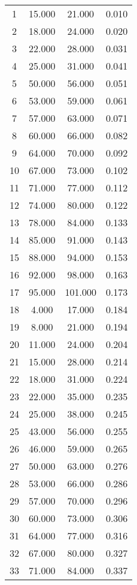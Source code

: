 % 
\begin{tabular}{cccc}
  \hline
  \hline
1 & 15.000 & 21.000 & 0.010 \\ 
  2 & 18.000 & 24.000 & 0.020 \\ 
  3 & 22.000 & 28.000 & 0.031 \\ 
  4 & 25.000 & 31.000 & 0.041 \\ 
  5 & 50.000 & 56.000 & 0.051 \\ 
  6 & 53.000 & 59.000 & 0.061 \\ 
  7 & 57.000 & 63.000 & 0.071 \\ 
  8 & 60.000 & 66.000 & 0.082 \\ 
  9 & 64.000 & 70.000 & 0.092 \\ 
  10 & 67.000 & 73.000 & 0.102 \\ 
  11 & 71.000 & 77.000 & 0.112 \\ 
  12 & 74.000 & 80.000 & 0.122 \\ 
  13 & 78.000 & 84.000 & 0.133 \\ 
  14 & 85.000 & 91.000 & 0.143 \\ 
  15 & 88.000 & 94.000 & 0.153 \\ 
  16 & 92.000 & 98.000 & 0.163 \\ 
  17 & 95.000 & 101.000 & 0.173 \\ 
  18 & 4.000 & 17.000 & 0.184 \\ 
  19 & 8.000 & 21.000 & 0.194 \\ 
  20 & 11.000 & 24.000 & 0.204 \\ 
  21 & 15.000 & 28.000 & 0.214 \\ 
  22 & 18.000 & 31.000 & 0.224 \\ 
  23 & 22.000 & 35.000 & 0.235 \\ 
  24 & 25.000 & 38.000 & 0.245 \\ 
  25 & 43.000 & 56.000 & 0.255 \\ 
  26 & 46.000 & 59.000 & 0.265 \\ 
  27 & 50.000 & 63.000 & 0.276 \\ 
  28 & 53.000 & 66.000 & 0.286 \\ 
  29 & 57.000 & 70.000 & 0.296 \\ 
  30 & 60.000 & 73.000 & 0.306 \\ 
  31 & 64.000 & 77.000 & 0.316 \\ 
  32 & 67.000 & 80.000 & 0.327 \\ 
  33 & 71.000 & 84.000 & 0.337 \\ 

\end{tabular}
